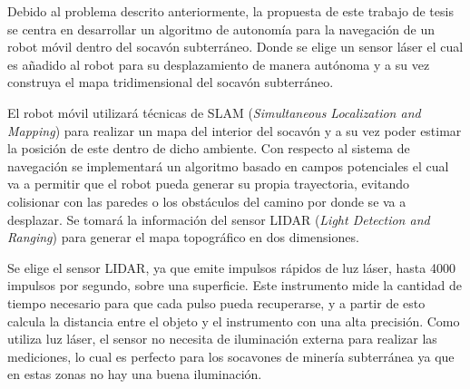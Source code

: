 

Debido al problema descrito anteriormente, la propuesta de este trabajo de tesis se centra en desarrollar un algoritmo de autonomía para la navegaci\'on de un robot m\'ovil dentro del socav\'on subterr\'aneo. Donde se elige un sensor l\'aser el cual es añadido al robot para su desplazamiento de manera aut\'onoma y a su vez construya el mapa tridimensional del socavón subterr\'aneo.

El robot m\'ovil utilizar\'a t\'ecnicas de SLAM (\textit{Simultaneous Localization and Mapping}) para realizar un mapa del interior del socav\'on y a su vez poder estimar la posici\'on de este dentro de dicho ambiente. Con respecto al sistema de navegaci\'on se implementar\'a un algoritmo basado en campos potenciales el cual va a permitir que el robot pueda generar su propia trayectoria, evitando colisionar con las paredes o los obst\'aculos del camino por donde se va a desplazar. Se tomar\'a la informaci\'on del sensor LIDAR (\textit{Light Detection and Ranging}) para generar el mapa topogr\'afico en dos dimensiones.

Se elige el sensor LIDAR, ya que emite impulsos r\'apidos de luz l\'aser, hasta 4000 impulsos por segundo, sobre una superficie. Este instrumento mide la cantidad de tiempo necesario para que cada pulso pueda recuperarse, y a partir de esto calcula la distancia entre el objeto y el instrumento con una alta precisi\'on. Como utiliza luz l\'aser, el sensor no necesita de iluminaci\'on externa para realizar las mediciones, lo cual es perfecto para los socavones de miner\'ia subterránea ya que en estas zonas no hay una buena iluminaci\'on. 

